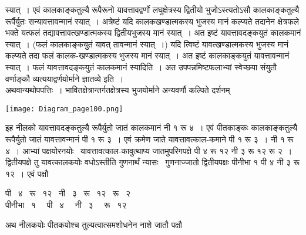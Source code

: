 \documentclass[11pt, openany]{book}
\begin{document}
\begin{sloppypar}
\noindent स्यात्~। एवं कालकाङ्कतुल्यै रूपैरूनो यावत्तावद्वर्णो लघुक्षेत्रस्य द्वितीयो भुजोऽस्त्यतोऽसौ कालकाङ्कतुल्यै रूर्पैर्युतः सन्यावत्तावन्मानं स्यात्~। अत्रेष्टं यदि कालकखण्डात्मकस्य भुजस्य मानं कल्प्यते तदानेन क्षेत्रफले भक्ते यत्फलं तद्यावत्तावत्खण्डात्मकस्य द्वितीयभुजस्य मानं स्यात्~। अत इष्टं यावत्तावदङ्कयुतं कालकमानं स्यात्~। (फलं कालकाङ्कयुतं यावत् तावन्मानं स्यात्~।) यदि त्विष्टं यावत्खण्डात्मकस्य भुजस्य मानं कल्प्यते तदा फलं कालक-खण्डात्मकस्य भुजस्य मानं स्यात्~। अत इष्टं कालकाङ्कयुतं यावत्तावन्मानं स्यात्~। फलं यावत्तावदङ्कयुतं कालकमानं स्यादिति~। अत उपपन्नमिष्टफलाभ्यां स्वेच्छया संयुतौ वर्णाङ्कौ व्यत्ययाद्वर्णयोर्माने ज्ञातव्ये इति~।\\ 

अथवान्यथोपपत्तिः~। भावितक्षेत्रान्तर्गतक्षेत्रस्य भुजयोर्माने अन्यवर्णौ कल्पिते दर्शनम्

\begin{center}
\texttt{[image: Diagram\_page100.png]}
\end{center}

इह नीलको यावत्तावदङ्कतुल्यै रूपैर्युतो जातं कालकमानं नी १ रू ४~। एवं पीतकाङ्कः कालकाङ्कतुल्यै रूपैर्युतो जातं यावत्तावन्मानं पी १ रू ३~। एवं क्रमेण जाते यावत्तावत्काल-कमाने पी १ रू ३~। नी १ रू ४~। आभ्यां पक्षयोरनयोः \, यावत्तावत्काल-कावुत्थाप्य जातमुपरिगपक्षे पी ४ रू १२ नी ३ रू १२ रू २~। द्वितीयपक्षे तु यावत्कालकयोः वधोऽस्तीति गुणनार्थं न्यासः \, गुणनाज्जातो द्वितीयपक्षः पीनीभा १ पी ४ नी ३ रू १२~। एवं पक्षौ 
\vspace{-1mm}

\begin{center}
पी ~४ ~रू ~१२ ~नी ~३ ~रू ~१२ ~रू ~२ \\
पीनीभा ~१ ~~पी ~४ ~~नी ~३ ~~रू ~१२ 
\end{center}
\vspace{-1mm}

\noindent अथ नीलकयोः पीतकयोश्च तुल्यत्वात्समशोधनेन नाशे जातौ पक्षौ 

\end{sloppypar}
\end{document}
